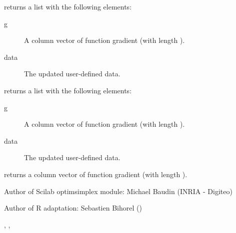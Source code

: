 %
\begin{Value}
 returns a list with the following elements:
\begin{description}

\item[g] A column vector of function gradient (with length ).
\item[data] The updated user-defined data.

\end{description}


 returns a list with the following elements:
\begin{description}

\item[g] A column vector of function gradient (with length ).
\item[data] The updated user-defined data.

\end{description}


 returns a column vector of function gradient
(with length ).
\end{Value}
%
\begin{Author}\relax
Author of Scilab optimsimplex module: Michael Baudin (INRIA - Digiteo)

Author of R adaptation: Sebastien Bihorel ()
\end{Author}
%
\begin{SeeAlso}\relax
{},
,
\end{SeeAlso}
